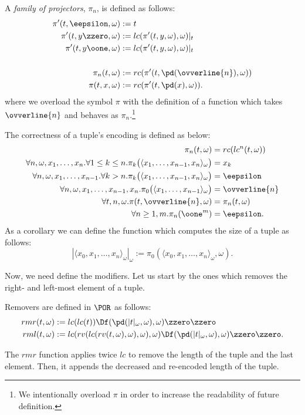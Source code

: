 \begin{defn}
A \emph{family of projectors}, $\pi_n$, is defined
as follows:
\begin{align*}
\pi'(t,\eepsilon,\omega) &:= t \\
%
\pi'(t,y\zzero,\omega) &:=
lc(\pi'(t,y,\omega), \omega)|_t \\
%
\pi'(t,y\oone,\omega) &:=
lc(\pi'(t,y,\omega),\omega)|_t \\
\\
%
\pi_n(t,\omega) &:= rc(\pi'(t,\pd
({\ovverline{n}}),
\omega)) \\
%
\pi(t,x,\omega) &:=
rc(\pi'(t,\pd(x),\omega)).
\end{align*}
where we overload the symbol $\pi$ with the
 definition
of a function which takes
{$\ovverline{n}$}
and behaves as $\pi_n$.\footnote{We intentionally
overload $\pi$
in order to increase the readability of
future definition.}
\end{defn}

The correctness of a tuple's encoding
is defined as below:
\begin{align*}
\pi_n(t,\omega) &= rc(lc^n(t,\omega)) \\
\forall n,\omega, x_1,\dots,x_n.
\forall 1\leq k\leq n. \pi_k\big(
\langle x_1,\dots, x_{n-1},x_n\rangle_\omega\big)
&= x_k \\
%
\forall n,\omega,x_1,\dots, x_{n-1}.\forall k
> n. \pi_k\big(\langle x_1,\dots, x_{n-1},x_n\rangle_\omega
\big) &= \eepsilon \\
%
\forall n,\omega, x_1,\dots, x_{n-1},x_n.
\pi_0\big(\langle x_1,\dots, x_{n-1}\rangle_\omega
\big) &= {\ovverline{n}} \\
%
\forall t,n,\omega.\pi(t,{\ovverline{n}},
\omega) &= \pi_n(t,\omega) \\
\forall n\ge 1,m.\pi_n(\oone^m) &= \eepsilon.
\end{align*}
%
As a corollary we can define
the function which computes the
size of a tuple as follows:
$$
|\langle x_0,x_1,\dots, x_n\rangle_\omega
|_{\omega} :=
\pi_0 (\langle x_0,x_1,\dots, x_n\rangle_\omega,\omega).
$$


Now, we need define the modifiers.
Let us start by the ones which removes
the right- and left-most
element of a tuple.


\begin{defn}[Removers]
Removers are defined in $\POR$ as follows:
\begin{align*}
rmr(t,\omega) &:= lc(lc(t)) \Df(\pd(|t|_\omega,\omega),
\omega)\zzero\zzero \\
rml(t,\omega) &:= lc(rv(lc(rv(t,\omega),\omega),
\omega),\omega)\Df(\pd(|t|_\omega,\omega),
\omega)\zzero\zzero.
\end{align*}
\end{defn}
%
%
\noindent
{The $rmr$ function applies twice
$lc$ to remove the length of the tuple
and the last element.}
Then, it appends the decreased and
re-encoded length of the tuple.

